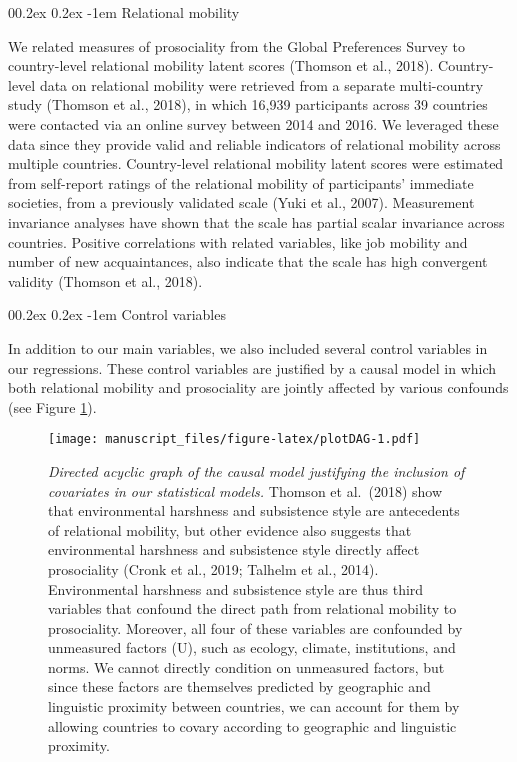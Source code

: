 \documentclass[
  man,floatsintext]{apa6}
\makeatletter
\let\oldparagraph\paragraph
\renewcommand{\paragraph}[1]{\oldparagraph{#1}\mbox{}}
\renewcommand{\paragraph}{\@startsection{paragraph}{4}{\parindent}%
  {0\baselineskip \@plus 0.2ex \@minus 0.2ex}%
  {-1em}%
  {\normalfont\normalsize\bfseries\itshape\typesectitle}}
\makeatother
\begin{document}
\hypertarget{relational-mobility}{%
\paragraph{Relational mobility}\label{relational-mobility}}

We related measures of prosociality from the Global Preferences Survey to country-level relational mobility latent scores (Thomson et al., 2018). Country-level data on relational mobility were retrieved from a separate multi-country study (Thomson et al., 2018), in which 16,939 participants across 39 countries were contacted via an online survey between 2014 and 2016. We leveraged these data since they provide valid and reliable indicators of relational mobility across multiple countries. Country-level relational mobility latent scores were estimated from self-report ratings of the relational mobility of participants' immediate societies, from a previously validated scale (Yuki et al., 2007). Measurement invariance analyses have shown that the scale has partial scalar invariance across countries. Positive correlations with related variables, like job mobility and number of new acquaintances, also indicate that the scale has high convergent validity (Thomson et al., 2018).

\hypertarget{control-variables}{%
\paragraph{Control variables}\label{control-variables}}

In addition to our main variables, we also included several control variables in our regressions. These control variables are justified by a causal model in which both relational mobility and prosociality are jointly affected by various confounds (see Figure \ref{fig:plotDAG}).



\begin{figure}
\centering
\texttt{[image: manuscript\_files/figure-latex/plotDAG-1.pdf]}
\caption{\label{fig:plotDAG}\emph{Directed acyclic graph of the causal model justifying the inclusion of covariates in our statistical models.} Thomson et al.~(2018) show that environmental harshness and subsistence style are antecedents of relational mobility, but other evidence also suggests that environmental harshness and subsistence style directly affect prosociality (Cronk et al., 2019; Talhelm et al., 2014). Environmental harshness and subsistence style are thus third variables that confound the direct path from relational mobility to prosociality. Moreover, all four of these variables are confounded by unmeasured factors (U), such as ecology, climate, institutions, and norms. We cannot directly condition on unmeasured factors, but since these factors are themselves predicted by geographic and linguistic proximity between countries, we can account for them by allowing countries to covary according to geographic and linguistic proximity.}
\end{figure}
\end{document}

